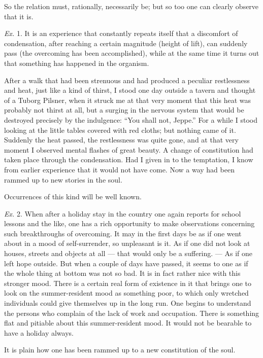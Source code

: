 \documentclass[12pt,a4paper,openany]{book}
\newcommand{\opage}[1]{\marginnote{\footnotesize\textit{[#1]}}}
\begin{document}
So the relation must, rationally, necessarily be; but
so too one can clearly observe that it is.

\emph{Ex.} 1. It is an experience that constantly repeats itself that a
discomfort of condensation, after reaching a certain magnitude (height of lift),
can suddenly pass (the overcoming has been accomplished),
while at the same time it turns out that something has happened in the organism.

After a walk that had been strenuous and had produced
a peculiar restlessness and heat, just like a kind of thirst,
I stood one day outside a tavern and thought of a Tuborg
\setcounter{footnote}{0}%
\opage{294}Pilsner, when it struck me at that very moment that this heat
was probably not thirst at all, but a surging in the nervous system
that would be destroyed precisely by the indulgence: ``You shall not,
Jeppe.'' For a while I stood looking at the little tables covered with red
cloths; but nothing came of it. Suddenly
the heat passed, the restlessness was quite gone, and at that very moment I observed
mental flashes of great beauty. A change of constitution had taken place
through the condensation. Had I given in
to the temptation, I know from earlier experience that it would not have
come. Now a way had been rammed up to new stories in the soul.

Occurrences of this kind will be well known.

\emph{Ex.} 2. When after a holiday stay in the country one again
reports for school lessons and the like, one has a rich opportunity to make
observations concerning such breakthroughs of overcoming.
It may in the first days be as if one went about in a mood
of self-surrender, so unpleasant is it. As if one did not
look at houses, streets and objects at all --- that would only be
a suffering. --- As if one left hope outside. But when a couple of days
have passed, it seems to one as if the whole thing at bottom
was not so bad. It is in fact rather nice with this stronger
mood. There is a certain real form of existence in it
that brings one to look on the summer-resident mood as something
poor, to which only wretched individuals could give themselves up in the long run.
One begins to understand the persons who complain of
the lack of work and occupation. There is something flat and
pitiable about this summer-resident mood. It would not
be bearable to have a holiday always.

It is plain how one has been rammed up to a
new constitution of the soul.
\end{document}
